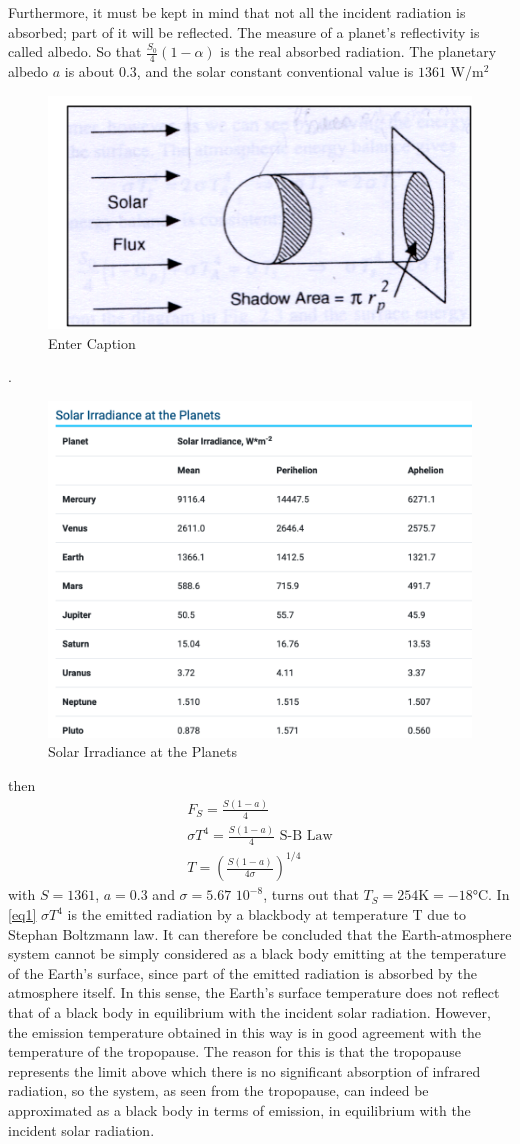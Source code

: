 Furthermore, it must be kept in mind that not all the incident radiation is absorbed; part of it will be reflected. The measure of a planet's reflectivity is called albedo.
So that $\frac{S_{0}}{4} (1-\alpha)$ is the real absorbed radiation.
The planetary albedo $a$ is about $0.3$, and the solar constant conventional value is $1361$ W/m$^2$
\begin{figure}[h!]
	\centering
	\includegraphics[width=0.5\linewidth]{uploads/47image.png}
	\caption{Enter Caption}
	\label{fig: fig1}
\end{figure}
.
\begin{figure}[h!]
	\centering
	\includegraphics[width=0.5\linewidth]{uploads/Screenshot 2024-11-19 154224.png}
	\caption{Solar Irradiance at the Planets}
	\label{fig:enter-label}
\end{figure}
then
\begin{align*}\label{eq1}
	F_S=\frac{S(1-a)}{4}                            \\
	\sigma T^4= \frac{S(1-a)}{4} \,\,\text{S-B Law} \\
	T=\left(\frac{S(1-a)}{4\sigma}\right)^{1/4}
\end{align*}
with $S=1361$, $a=0.3$ and $\sigma=5.67 \, \, 10^{-8}$, turns out that $T_S=254\text{K}=-18°\text{C}$.
In \ref{eq1} $\sigma T^4$ is the emitted radiation by a blackbody at temperature T due to Stephan Boltzmann law.
It can therefore be concluded that the Earth-atmosphere system cannot be simply considered as a black body emitting at the temperature of the Earth's surface, since part of the emitted radiation is absorbed by the atmosphere itself. In this sense, the Earth's surface temperature does not reflect that of a black body in equilibrium with the incident solar radiation. However, the emission temperature obtained in this way is in good agreement with the temperature of the tropopause. The reason for this is that the tropopause represents the limit above which there is no significant absorption of infrared radiation, so the system, as seen from the tropopause, can indeed be approximated as a black body in terms of emission, in equilibrium with the incident solar radiation.

